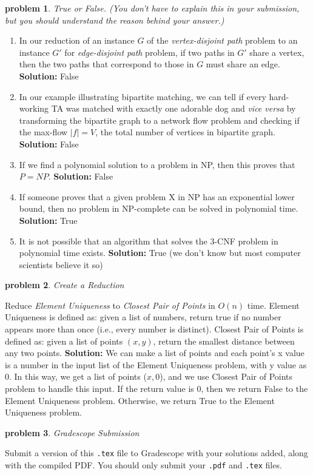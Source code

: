 \documentclass[10pt]{article}
\newcommand{\solution}[1]{\color{blue}\hfill\break\noindent\textbf{Solution:} #1\color{black}}
\newtheorem{problem}{\sc\color{cit}problem}
\begin{document}
\begin{problem} True or False. (You don't have to explain this in your submission, but you should understand the reason behind your answer.)  \end{problem}

\begin{enumerate}
\renewcommand{\theenumi}{\Alph{enumi}}

\item In our reduction of an instance $G$ of the \emph{vertex-disjoint path} problem to an instance $G'$ for \emph{edge-disjoint path} problem, if two paths in $G'$ share a vertex, then the two paths that correspond to those in $G$ must share an edge.
\solution{
False
}

\item In our example illustrating bipartite matching, we can tell if every hard-working TA was matched with exactly one adorable dog and \textit{vice versa} by transforming the bipartite graph to a network flow problem and checking if the max-flow $|f| = V$, the total number of vertices in bipartite graph.
\solution{
False
}

\item If we find a polynomial solution to a problem in NP, then this proves that $P=NP$.
\solution{
False
}

\item If someone proves that a given problem X in NP has an exponential lower bound, then no problem in NP-complete can be solved in polynomial time. 
\solution{
True
}

\item It is not possible that an algorithm that solves the 3-CNF problem in polynomial time exists.
\solution{
True (we don't know but most computer scientists believe it so)
}

\end{enumerate}


\begin{problem}Create a Reduction\end{problem}
Reduce \textit{Element Uniqueness} to \textit{Closest Pair of Points} in $O(n)$ time.  Element Uniqueness is defined as: given a list of numbers, return true if no number appears more than once (i.e., every number is distinct).  Closest Pair of Points is defined as: given a list of points $(x,y)$, return the smallest distance between any two points.
\solution{
We can make a list of points and each point's x value is a number in the input list of the Element Uniqueness problem, with y value as $0$. In this way, we get a list of points ($x,0$), and we use Closest Pair of Points problem to handle this input. If the return value is $0$, then we return False to the Element Uniqueness problem. Otherwise, we return True to the Element Uniqueness problem.
}

\begin{problem} Gradescope Submission \end{problem}
Submit a version of this \verb|.tex| file to Gradescope with your solutions added, along with the compiled PDF.  You should only submit your \verb|.pdf| and \verb|.tex| files.
\end{document}
